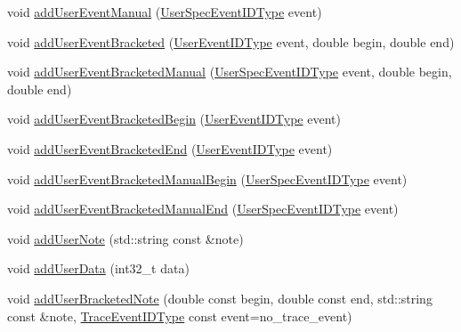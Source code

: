 \begin{DoxyCompactItemize}
\item 
void \hyperlink{structvt_1_1trace_1_1_trace_a2d9fac6bd71ba67e4f87b7efd7c6c6c7}{add\+User\+Event\+Manual} (\hyperlink{namespacevt_1_1trace_a70c43e0e1596eea236912d4197d3120a}{User\+Spec\+Event\+I\+D\+Type} event)
\item 
void \hyperlink{structvt_1_1trace_1_1_trace_ae57a7ff5517a5bc0694677f10810b545}{add\+User\+Event\+Bracketed} (\hyperlink{namespacevt_1_1trace_a5908920d051c144c89f17c69ed262350}{User\+Event\+I\+D\+Type} event, double begin, double end)
\item 
void \hyperlink{structvt_1_1trace_1_1_trace_ab0dd676ca3870682b0c52669d3603c11}{add\+User\+Event\+Bracketed\+Manual} (\hyperlink{namespacevt_1_1trace_a70c43e0e1596eea236912d4197d3120a}{User\+Spec\+Event\+I\+D\+Type} event, double begin, double end)
\item 
void \hyperlink{structvt_1_1trace_1_1_trace_a1264ea508298bfeb6a6ef5e06d9214f9}{add\+User\+Event\+Bracketed\+Begin} (\hyperlink{namespacevt_1_1trace_a5908920d051c144c89f17c69ed262350}{User\+Event\+I\+D\+Type} event)
\item 
void \hyperlink{structvt_1_1trace_1_1_trace_a9ed44cd0fb5939013ae30de2aeb8aa0e}{add\+User\+Event\+Bracketed\+End} (\hyperlink{namespacevt_1_1trace_a5908920d051c144c89f17c69ed262350}{User\+Event\+I\+D\+Type} event)
\item 
void \hyperlink{structvt_1_1trace_1_1_trace_ab6def24560e35a011beb771b2a05894c}{add\+User\+Event\+Bracketed\+Manual\+Begin} (\hyperlink{namespacevt_1_1trace_a70c43e0e1596eea236912d4197d3120a}{User\+Spec\+Event\+I\+D\+Type} event)
\item 
void \hyperlink{structvt_1_1trace_1_1_trace_a5de97038ac60bfcdf868c3f32637ef9e}{add\+User\+Event\+Bracketed\+Manual\+End} (\hyperlink{namespacevt_1_1trace_a70c43e0e1596eea236912d4197d3120a}{User\+Spec\+Event\+I\+D\+Type} event)
\item 
void \hyperlink{structvt_1_1trace_1_1_trace_a8be5309a84a6d0f99df0eb835fedf3b1}{add\+User\+Note} (std\+::string const \&note)
\item 
void \hyperlink{structvt_1_1trace_1_1_trace_a7f5ede52aa552c2eac88b894853a2efe}{add\+User\+Data} (int32\+\_\+t data)
\item 
void \hyperlink{structvt_1_1trace_1_1_trace_acb4416918d08379892bcf9ec85621309}{add\+User\+Bracketed\+Note} (double const begin, double const end, std\+::string const \&note, \hyperlink{namespacevt_1_1trace_a64a7185f3e102df8d8258f263ccd1582}{Trace\+Event\+I\+D\+Type} const event=no\+\_\+trace\+\_\+event)
\item 

\end{DoxyCompactItemize}
